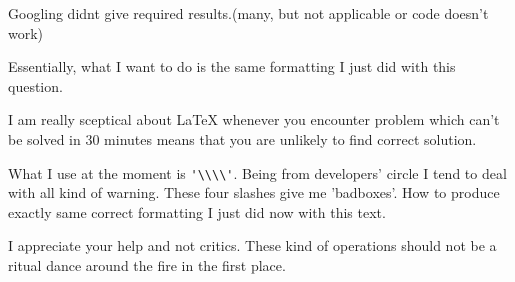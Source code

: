 \documentclass{article}
\begin{document}
Googling didnt give required results.(many, but not applicable or code doesn't work)

Essentially, what I want to do is the same formatting I just did with this question.

I am really sceptical about LaTeX whenever you encounter problem which can't be solved in 30 minutes means that you are unlikely to find correct solution.

What I use at the moment is \verb|'\\\\'|. Being from developers' circle I tend to deal with all kind of warning. These four slashes give me 'badboxes'. How to produce exactly same correct formatting I just did now with this text.

I appreciate your help and not critics. These kind of operations should not be a ritual dance around the fire in the first place.
\end{document}
